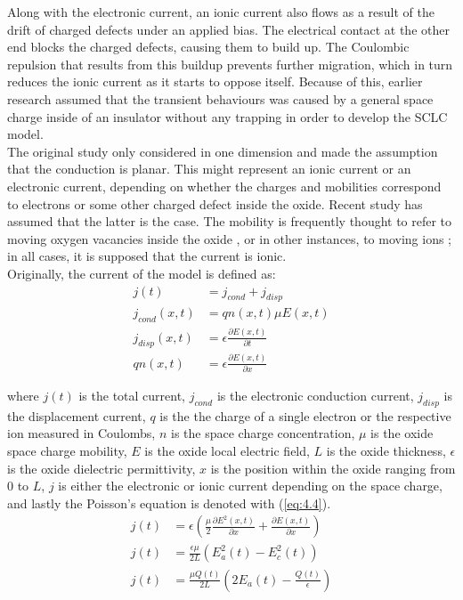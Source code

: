 \noindent Along with the electronic current, an ionic current also flows as a result of the drift of charged defects under an applied bias. The electrical contact at the other end blocks the charged defects, causing them to build up. The Coulombic repulsion that results from this buildup prevents further migration, which in turn reduces the ionic current as it starts to oppose itself. Because of this, earlier research assumed that the transient behaviours was caused by a general space charge inside of an insulator without any trapping in order to develop the SCLC model. \\

\noindent The original study only considered in one dimension and made the assumption that the conduction is planar. This might represent an ionic current or an electronic current, depending on whether the charges and mobilities correspond to electrons or some other charged defect inside the oxide. Recent study has assumed that the latter is the case. The mobility is frequently thought to refer to moving oxygen vacancies inside the oxide \cite{zafar1998oxygen}, or in other instances, to moving ions \cite{chen2010observation}; in all cases, it is supposed that the current is ionic. \\

\noindent Originally, the current of the model is defined as:
\begin{align}
j(t) &= j_{cond} + j_{disp} \label{eq:4.1} \\
j_{cond}(x,t) &= qn(x,t)\mu E(x,t) \label{eq:4.2} \\
j_{disp}(x,t) &= \epsilon \frac{\partial E(x,t)}{\partial t} \label{eq:4.3} \\
qn(x,t) &=  \epsilon \frac{\partial E(x,t)}{\partial x} \label{eq:4.4}
\end{align}

\noindent where $j(t)$ is the total current, $j_{cond}$ is the electronic conduction current, $j_{disp}$ is the displacement current, $q$ is the the charge of a single electron or the respective ion measured in Coulombs, $n$ is the space charge concentration, $\mu$ is the oxide space charge mobility, $E$ is the oxide local electric field, $L$ is the oxide thickness, $\epsilon$ is the oxide dielectric permittivity, $x$ is the position within the oxide ranging from 0 to $L$, $j$ is either the electronic or ionic current depending on the space charge, and lastly the Poisson's equation is denoted with (\ref{eq:4.4}).
\begin{align}
j(t) &= \epsilon \left( \frac{\mu}{2} \frac{\partial E^{2}(x,t)}{\partial x} + \frac{\partial E(x,t)}{\partial x} \right) \label{eq:4.5} \\
j(t) &= \frac{\epsilon \mu}{2L}\left( E^{2}_{a}(t) - E^{2}_{c}(t) \right) \label{eq:4.6} \\
j(t) &= \frac{\mu Q(t)}{2L}\left( 2E_a(t) - \frac{Q(t)}{\epsilon} \right) \label{eq:4.7}
\end{align}

